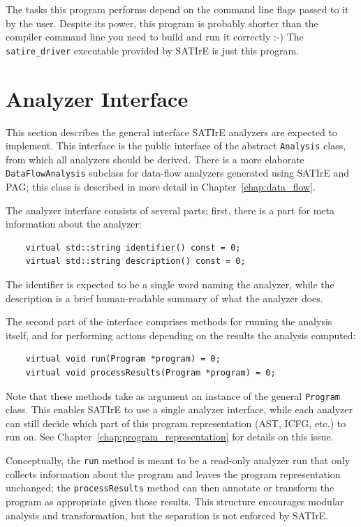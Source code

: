 \documentclass[a4paper,12pt]{report}
\begin{document}
The tasks this program performs depend on the command line flags passed to
it by the user. Despite its power, this program is probably shorter than the
compiler command line you need to build and run it correctly :-) The
\verb|satire_driver| executable provided by SATIrE is just this program.

\section{Analyzer Interface}
\label{sec:analyzer_interface}

This section describes the general interface SATIrE analyzers are expected
to implement. This interface is the public interface of the abstract
\texttt{Analysis} class, from which all analyzers should be derived. There
is a more elaborate \texttt{DataFlowAnalysis} subclass for data-flow
analyzers generated using SATIrE and PAG; this class is described in more
detail in Chapter~\ref{chap:data_flow}.

The analyzer interface consists of several parts; first, there is a part for
meta information about the analyzer:
\begin{verbatim}
    virtual std::string identifier() const = 0;
    virtual std::string description() const = 0;
\end{verbatim}
The identifier is expected to be a single word naming the analyzer, while
the description is a brief human-readable summary of what the analyzer does.

The second part of the interface comprises methods for running the analysis
itself, and for performing actions depending on the results the analysis
computed:
\begin{verbatim}
    virtual void run(Program *program) = 0;
    virtual void processResults(Program *program) = 0;
\end{verbatim}
Note that these methods take as argument an instance of the general
\texttt{Program} class. This enables SATIrE to use a single analyzer
interface, while each analyzer can still decide which part of this program
representation (AST, ICFG, etc.) to run on. See
Chapter~\ref{chap:program_representation} for details on this issue.

Conceptually, the \texttt{run} method is meant to be a read-only analyzer
run that only collects information about the program and leaves the program
representation unchanged; the \texttt{processResults} method can then
annotate or transform the program as appropriate given those results. This
structure encourages modular analysis and transformation, but the separation
is not enforced by SATIrE.
\end{document}
